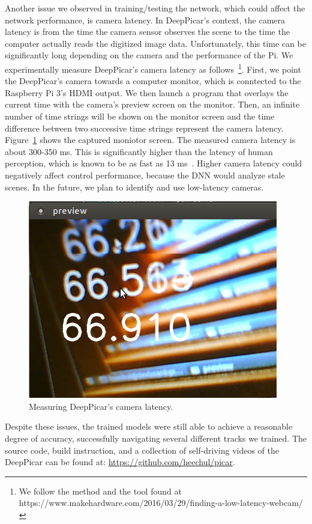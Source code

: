 Another issue we observed in training/testing the network, which could
affect the network performance, is camera latency. In DeepPicar's
context, the camera latency is from the time the camera
sensor observes the scene to the time the computer actually reads the
digitized image data. Unfortunately, this time can be significantly
long depending on the camera and the performance of the Pi. We
experimentally measure DeepPicar's camera latency as
follows~\footnote{We follow the method and the tool found at
  https://www.makehardware.com/2016/03/29/finding-a-low-latency-webcam/}.
First, we point the DeepPicar's camera towards a computer monitor, which is
conntected to the Raspberry Pi 3's HDMI output. We then launch a 
program that overlays the current time with the camera's preview
screen on the monitor. Then, an infinite number of time strings will be
shown on the monitor screen and the time difference between two
successive time strings represent the camera
latency. Figure~\ref{fig:camera-latency} shows the captured moniotor
screen. The measured camera latency is about 300-350 ms. This is
significantly higher than the latency of human perception, which is known
to be as fast as 13 ms~\cite{ThomasBurger2015}. Higher camera latency
could negatively affect control performance, because the DNN would
analyze stale scenes. In the future, we plan to identify and use
low-latency cameras.

\begin{figure}[t]
  \centering
  \includegraphics[width=.4\textwidth]{figs/camera_latency}
  \caption{Measuring DeepPicar's camera latency.}
  \label{fig:camera-latency}
\end{figure}



Despite these issues, the trained models were still able to
achieve a reasonable degree of accuracy, successfully navigating
several different tracks we trained. The source code, build
instruction, and a collection of self-driving videos of the DeepPicar
can be found at: \url{https://github.com/heechul/picar}.
